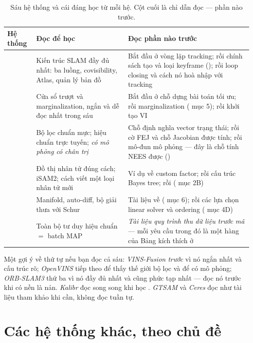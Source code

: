 \documentclass[../../vslam.tex]{subfiles}
\begin{document}
\begin{table}[H]\centering\small
\caption{Sáu hệ thống và cái đáng học từ mỗi hệ. Cột cuối là chỉ dẫn đọc --- phần nào trước.}
\label{tab:e23-systems}
\begin{tabularx}{\linewidth}{@{}L{2.2cm}L{3.2cm}Y@{}}
\toprule
\textbf{Hệ thống} & \textbf{Đọc để học} & \textbf{Đọc phần nào trước}\\
\midrule
{} & Kiến trúc SLAM đầy đủ nhất: ba luồng, covisibility, Atlas, quản lý bản đồ & Bắt đầu ở vòng lặp tracking; rồi chính sách tạo và loại keyframe (); rồi loop closing và cách nó hoà nhập với tracking\\
 & Cửa sổ trượt và marginalization, ngắn và dễ đọc nhất trong sáu & Bắt đầu ở chỗ dựng bài toán tối ưu; rồi marginalization ( mục 5); rồi khởi tạo VI\\
 & Bộ lọc chuẩn mực; hiệu chuẩn trực tuyến; \emph{có mô phỏng có chân trị} & Chỗ định nghĩa vector trạng thái; rồi cờ FEJ và chỗ Jacobian được tính; rồi mô-đun mô phỏng --- đây là chỗ tính NEES được ()\\
 & Đồ thị nhân tử đúng cách; iSAM2; cách viết một loại nhân tử mới & Ví dụ về custom factor; rồi cấu trúc Bayes tree; rồi  ( mục 2B)\\
 & Manifold, auto-diff, bộ giải thưa với Schur & Tài liệu về  ( mục 6); rồi các lựa chọn linear solver và ordering ( mục 4D)\\
 & Toàn bộ tư duy hiệu chuẩn \(=\) batch MAP & \emph{Tài liệu quy trình thu dữ liệu trước mã} --- mỗi yêu cầu trong đó là một hàng của Bảng kích thích ở \\
\bottomrule
\end{tabularx}
\end{table}

Một gợi ý về thứ tự nếu bạn đọc cả sáu: \emph{VINS-Fusion trước} vì nó ngắn nhất và cấu trúc rõ; \emph{OpenVINS} tiếp theo để thấy thế giới bộ lọc và để có mô phỏng; \emph{ORB-SLAM3} thứ ba vì nó đầy đủ nhất và cũng phức tạp nhất --- đọc nó trước khi có nền là nản. \emph{Kalibr} đọc song song khi học . \emph{GTSAM} và \emph{Ceres} đọc như tài liệu tham khảo khi cần, không đọc tuần tự.

\section{Các hệ thống khác, theo chủ đề}
\end{document}
